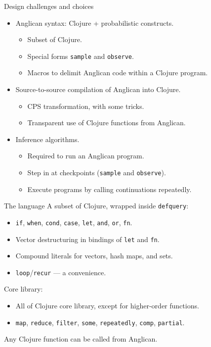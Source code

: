 \documentclass{beamer}
\begin{document}
\begin{frame}{Design challenges and choices}
\begin{itemize}
    \item Anglican syntax: Clojure + probabilistic constructs.
		\begin{itemize}
			\item Subset of Clojure.
			\item Special forms \texttt{sample} and \texttt{observe}.
			\item Macros to delimit Anglican code within a Clojure program.
		\end{itemize}
		\pause
		\bigskip
    \item Source-to-source compilation of Anglican into Clojure.
		\begin{itemize}
			\item CPS transformation, with some tricks.
			\item Transparent use of Clojure functions from Anglican.
		\end{itemize}
		\pause
		\bigskip
    \item Inference algorithms.
		\begin{itemize}
            \item Required to run an Anglican program.
			\item Step in at checkpoints (\texttt{sample} and \texttt{observe}).
			\item Execute programs by calling continuations repeatedly.
		\end{itemize}
\end{itemize}
\end{frame}

\begin{frame}{The language}
    A subset of Clojure, wrapped inside \texttt{defquery}:
    \begin{itemize}
        \item \texttt{if}, \texttt{when}, \texttt{cond},
            \texttt{case}, \texttt{let}, \texttt{and}, \texttt{or},
            \texttt{fn}. 
        \item Vector destructuring in bindings of \texttt{let} and \texttt{fn}.
        \item Compound literals for vectors, hash maps, and sets.
        \item \texttt{loop}/\texttt{recur} --- a convenience.
    \end{itemize}
    \bigskip
    Core library:
    \begin{itemize}
        \item All of Clojure core library, except for
            higher-order functions.
        \item  \texttt{map}, \texttt{reduce},
\texttt{filter}, \texttt{some}, \texttt{repeatedly},
\texttt{comp}, \texttt{partial}.
    \end{itemize}
    \bigskip
    Any Clojure function can be called from Anglican.
\end{frame}
\end{document}
